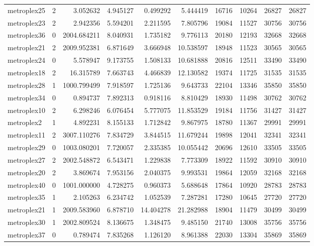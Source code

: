 \begin{longtable}{|l|r|r|r|r|r|r|r|r|r|}
metroplex25 & 2 & 3.052632 & 4.945127 & 0.499292 & 5.444419 & 16716 & 10264 & 26827 & 26827 \\
metroplex23 & 2 & 2.942356 & 5.594201 & 2.211595 & 7.805796 & 19084 & 11527 & 30756 & 30756 \\
metroplex36 & 0 & 2004.684211 & 8.040931 & 1.735182 & 9.776113 & 20180 & 12193 & 32668 & 32668 \\
metroplex21 & 2 & 2009.952381 & 6.871649 & 3.666948 & 10.538597 & 18948 & 11523 & 30565 & 30565 \\
metroplex24 & 0 & 5.578947 & 9.173755 & 1.508133 & 10.681888 & 20816 & 12511 & 33490 & 33490 \\
metroplex18 & 2 & 16.315789 & 7.663743 & 4.466839 & 12.130582 & 19374 & 11725 & 31535 & 31535 \\
metroplex28 & 1 & 1000.799499 & 7.918597 & 1.725136 & 9.643733 & 22104 & 13346 & 35850 & 35850 \\
metroplex34 & 0 & 0.894737 & 7.892313 & 0.918116 & 8.810429 & 18930 & 11498 & 30762 & 30762 \\
metroplex10 & 2 & 6.298246 & 6.076454 & 5.777075 & 11.853529 & 19184 & 11756 & 31427 & 31427 \\
metroplex2 & 1 & 4.892231 & 8.155133 & 1.712842 & 9.867975 & 18780 & 11367 & 29991 & 29991 \\
metroplex11 & 2 & 3007.110276 & 7.834729 & 3.844515 & 11.679244 & 19898 & 12041 & 32341 & 32341 \\
metroplex29 & 0 & 1003.080201 & 7.720057 & 2.335385 & 10.055442 & 20696 & 12610 & 33505 & 33505 \\
metroplex27 & 2 & 2002.548872 & 6.543471 & 1.229838 & 7.773309 & 18922 & 11592 & 30910 & 30910 \\
metroplex20 & 2 & 3.869674 & 7.953156 & 2.040375 & 9.993531 & 19864 & 12059 & 32168 & 32168 \\
metroplex40 & 0 & 1001.000000 & 4.728275 & 0.960373 & 5.688648 & 17864 & 10920 & 28783 & 28783 \\
metroplex35 & 1 & 2.105263 & 6.234742 & 1.052539 & 7.287281 & 17280 & 10645 & 27720 & 27720 \\
metroplex21 & 1 & 2009.583960 & 6.878710 & 14.404278 & 21.282988 & 18904 & 11479 & 30499 & 30499 \\
metroplex30 & 1 & 2002.809524 & 8.136675 & 1.348475 & 9.485150 & 21740 & 13008 & 35756 & 35756 \\
metroplex37 & 0 & 0.789474 & 7.835268 & 1.126120 & 8.961388 & 22030 & 13304 & 35869 & 35869 \\

\end{longtable}
